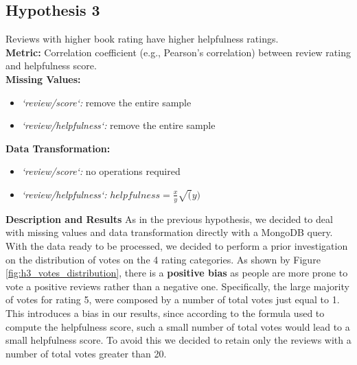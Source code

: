 \subsection*{Hypothesis 3}

Reviews with higher book rating have higher helpfulness ratings.\\
\noindent
\textbf{Metric:} Correlation coefficient (e.g., Pearson's correlation) between review rating and helpfulness score.\\
\noindent
\textbf{Missing Values:}
\begin{itemize}
    \item \textit{`review/score`:} remove the entire sample
    \item \textit{`review/helpfulness`:} remove the entire sample
\end{itemize}
\noindent
\textbf{Data Transformation:}
\begin{itemize}
    \item \textit{`review/score`:} no operations required
    \item \textit{`review/helpfulness`:} $helpfulness = \frac{x}{y} \sqrt(y)$
\end{itemize}\vspace{0.5cm}
\noindent
\textbf{Description and Results}
As in the previous hypothesis, we decided to deal with missing values and data transformation directly with a MongoDB query. With the data ready to
be processed, we decided to perform a prior investigation on the distribution of votes on the 4 rating categories. As shown by Figure \ref{fig:h3_votes_distribution},
there is a \textbf{positive bias} as people are more prone to vote a positive reviews rather than a negative one. Specifically, the large majority of votes
for rating 5, were composed by a number of total votes just equal to 1. This introduces a bias in our results, since according to the formula used 
to compute the helpfulness score, such a small number of total votes would lead to a small helpfulness score.
To avoid this we decided to retain only the reviews with a number of total votes greater than 20.

